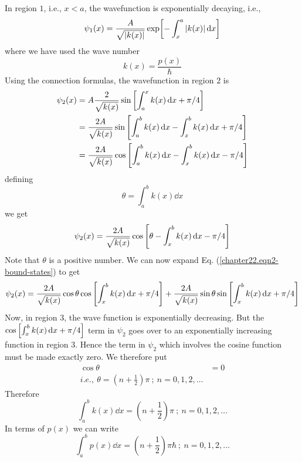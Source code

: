 In region $1$, i.e., $x<a$, the wavefunction is exponentially decaying, i.e., 
\begin{equation}
	\psi_1(x) = \frac{A}{\sqrt{\abs{k(x)}}} \exp[-\int_{x}^{a} \abs{k(x)} 
	\dd{x}]
	\label{chapter22.eqn1-bound-states}
\end{equation}
where we have used the wave number 
\begin{equation}
	k(x) = \frac{p(x)}{\hbar}
\end{equation}
Using the connection formulas, the wavefunction in region $2$ is
\begin{align*}
\psi_2(x) 
&= A \frac{2}{\sqrt{k(x)}} \sin \qty[\int_{a}^{x} k(x) \dd{x} + \pi/4] \\
&= \frac{2 A}{\sqrt{k(x)}} \sin \qty[\int_{a}^{b}k(x) \dd{x} - \int_{x}^{b} k(x) \dd{x}+ \pi/4 ] \\
&= \frac{2 A}{\sqrt{k(x)}} \cos \qty[\int_{a}^{b}k(x) \dd{x} - \int_{x}^{b} k(x) \dd{x} - \pi/4 ] 
\end{align*}
defining
\begin{equation}
	\theta = \int_{a}^{b}k(x) \dd{x}
\end{equation}
we get
\begin{equation}
\label{chapter22.eqn2-bound-states}
	\psi_2(x) = \frac{2 A}{\sqrt{k(x)}} \cos \qty[\theta - \int_{x}^{b} k(x) \dd{x} - \pi/4 ]
\end{equation}
Note that $\theta$ is a positive number. We can now expand Eq. (\ref{chapter22.eqn2-bound-states}) to get
\begin{equation}
\label{chapter22.eqn3-bound-states}
	\psi_2(x) = \frac{2 A}{\sqrt{k(x)}} \cos \theta \cos \qty[\int_{x}^{b} k(x) \dd{x} + \pi/4 ] +
	 \frac{2 A}{\sqrt{k(x)}} \sin\theta \sin \qty[\int_{x}^{b} k(x) \dd{x} + \pi/4 ]
\end{equation}
Now, in region $3$, the wave function is exponentially decreasing. But the $\cos \qty[\int_{x}^{b} k(x) \dd{x} + \pi/4 ]$ term in $\psi_2$ goes over to an exponentially increasing function in region $3$. Hence the term in $\psi_2$ which involves the cosine function must be made exactly zero. We therefore put
\begin{align*}
	\cos \theta &= 0 \\
	i.e., \ \theta = (n + \frac{1}{2}) \pi \ ; \ n = 0,1,2,\ldots
\end{align*}
Therefore
\begin{equation}
\label{chapter22.eqn4-bound-states}
	\int_{a}^{b} k(x) \dd{x} = (n + \frac{1}{2}) \pi \ ; \ n = 0,1,2,\ldots
\end{equation}
In terms of $p(x)$ we can write
\begin{equation}
\label{chapter22.eqn5-bound-states}
	\int_{a}^{b} p(x) \dd{x} = (n + \frac{1}{2}) \pi\hbar \ ; \ n = 0,1,2,\ldots
\end{equation}

